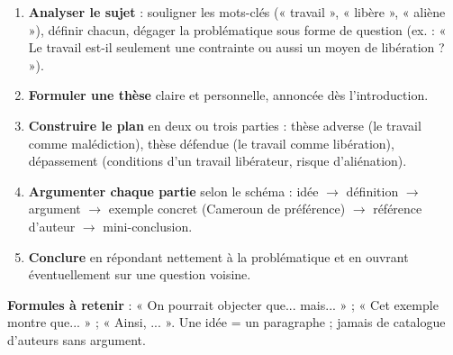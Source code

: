 \documentclass[11pt]{article}
\newcommand{\cle}[1]{{\popxbold\color{popdark}#1}}
\begin{document}
\begin{methode}
\begin{enumerate}
\item \textbf{Analyser le sujet} : souligner les mots-clés (« travail », « libère », « aliène »), définir chacun, dégager la \cle{problématique} sous forme de question (ex. : « Le travail est-il seulement une contrainte ou aussi un moyen de libération ? »).
\item \textbf{Formuler une thèse} claire et personnelle, annoncée dès l'introduction.
\item \textbf{Construire le plan} en deux ou trois parties : thèse adverse (le travail comme malédiction), thèse défendue (le travail comme libération), dépassement (conditions d'un travail libérateur, risque d'aliénation).
\item \textbf{Argumenter chaque partie} selon le schéma : idée $\rightarrow$ définition $\rightarrow$ argument $\rightarrow$ exemple concret (Cameroun de préférence) $\rightarrow$ référence d'auteur $\rightarrow$ mini-conclusion.
\item \textbf{Conclure} en répondant nettement à la problématique et en ouvrant éventuellement sur une question voisine.
\end{enumerate}
\textbf{Formules à retenir} : « On pourrait objecter que... mais... » ; « Cet exemple montre que... » ; « Ainsi, ... ». Une idée = un paragraphe ; jamais de catalogue d'auteurs sans argument.
\end{methode}
\end{document}
